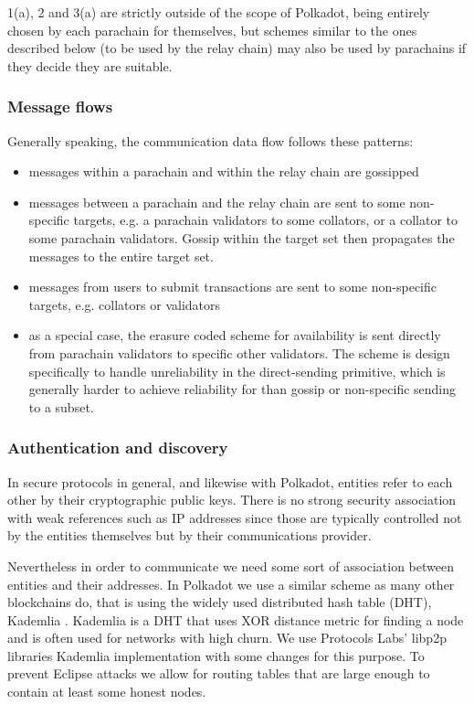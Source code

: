 1(a), 2 and 3(a) are strictly outside of the scope of Polkadot, being entirely chosen by each parachain for themselves, but schemes similar to the ones described below (to be used by the relay chain) may also be used by parachains if they decide they are suitable.

\subsubsection{Message flows}

Generally speaking, the communication data flow follows these patterns:

\begin{itemize}
\item messages within a parachain and within the relay chain are gossipped
\item messages between a parachain and the relay chain are sent to some non-specific targets, e.g. a parachain validators to some collators, or a collator to some parachain validators. Gossip within the target set then propagates the messages to the entire target set.
\item messages from users to submit transactions are sent to some non-specific targets, e.g. collators or validators
\item as a special case, the erasure coded scheme for availability is sent directly from parachain validators to specific other validators. The scheme is design specifically to handle unreliability in the direct-sending primitive, which is generally harder to achieve reliability for than gossip or non-specific sending to a subset.
\end{itemize}

\subsubsection{Authentication and discovery} \label{sec:auth_discovery}

In secure protocols in general, and likewise with Polkadot, entities refer to each other by their cryptographic public keys. There is no strong security association with weak references such as IP addresses since those are typically controlled not by the entities themselves but by their communications provider.

Nevertheless in order to communicate we need some sort of association between entities and their addresses. In Polkadot we use a similar scheme as many other blockchains do, that is using the widely used distributed hash table (DHT), Kademlia \cite{Maymounkov:2002:Kademila}. Kademlia is a DHT that uses XOR distance metric for finding a node and is often used for networks with high churn. We use Protocols Labs' libp2p libraries \cite{} Kademlia implementation with some changes for this purpose. To prevent Eclipse attacks \cite{eclipseattack} we allow for routing tables that are large enough to contain at least some honest nodes.

